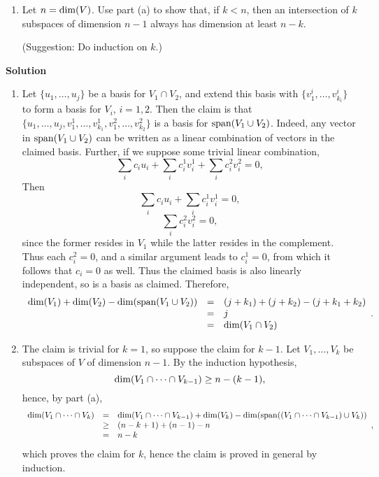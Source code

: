 \documentclass{article}
\def\dim{\mathop{\rm dim}\nolimits}
\def\span{\mathop{\rm span}\nolimits}
\begin{document}
\begin{enumerate}
\begin{enumerate}
\item Let \(n = \dim(V)\).  Use part (a) to show that, if \(k < n\), then an intersection of \(k\) subspaces of dimension \(n - 1\) always has dimension at least \(n - k\).

(Suggestion:  Do induction on \(k\).)

\end{enumerate}

{\bf Solution}

\begin{enumerate}
\item Let \(\{u_1, \ldots, u_j\}\) be a basis for \(V_1 \cap V_2\), and extend this basis with \(\{v^i_1, \ldots, v^i_{k_i}\}\) to form a basis for \(V_i\), \(i = 1,2\).  Then the claim is that \(\{u_1, \ldots, u_j, v^1_1, \ldots, v^1_{k_1}, v^2_1, \ldots, v^2_{k_2}\}\) is a basis for \(\span(V_1 \cup V_2)\).  Indeed, any vector in \(\span(V_1 \cup V_2)\) can be written as a linear combination of vectors in the claimed basis.  Further, if we suppose some trivial linear combination,
\[\sum_i c_i u_i + \sum_i c^1_i v^1_i + \sum_i c^2_i v^2_i = 0,\]
Then
\[\sum_i c_i u_i + \sum_i c^1_i v^1_i = 0,\]
\[\sum_i c^2_i v^2_i = 0,\]
since the former resides in \(V_1\) while the latter resides in the complement.  Thus each \(c^2_i = 0\), and a similar argument leads to \(c^1_i = 0\), from which it follows that \(c_i = 0\) as well.  Thus the claimed basis is also linearly independent, so is a basis as claimed.  Therefore,
\[\begin{array}{rcl}
  \dim(V_1) + \dim(V_2) - \dim(\span(V_1 \cup V_2))
  & = & (j + k_1) + (j + k_2) - (j + k_1 + k_2) \\
  & = & j \\
  & = & \dim(V_1 \cap V_2)
  \end{array}.\]

\item The claim is trivial for \(k = 1\), so suppose the claim for \(k - 1\).  Let \(V_1, \ldots, V_k\) be subspaces of \(V\) of dimension \(n - 1\).  By the induction hypothesis,
\[\dim(V_1 \cap \cdots \cap V_{k - 1}) \geq n - (k - 1),\]
hence, by part (a),
\[\begin{array}{rcl}
  \dim(V_1 \cap \cdots \cap V_k)
  &   =  & \dim(V_1 \cap \cdots \cap V_{k - 1}) + \dim(V_k) - \dim(\span((V_1 \cap \cdots \cap V_{k - 1}) \cup V_k)) \\
  & \geq & (n - k + 1) + (n - 1) - n \\
  &   =  & n - k
  \end{array},\]
which proves the claim for \(k\), hence the claim is proved in general by induction.


\end{enumerate}
\end{enumerate}
\end{document}
